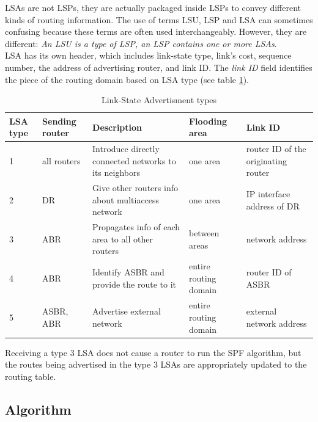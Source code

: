 LSAs are not LSPs, they are actually packaged inside LSPs to convey different kinds of routing information. The use of terms LSU, LSP and LSA can sometimes confusing because these terms are often used interchangeably. However, they are different: \emph{An LSU is a type of LSP, an LSP contains one or more LSAs}.\\
 
LSA has its own header, which includes link-state type, link's cost, sequence number, the address of advertising router, and link ID. The \emph{link ID} field identifies the piece of the routing domain based on LSA type (see table \ref{LSA-type}).

\begin{table}[h]
\centering
\caption{Link-State Advertisment types}
\label{LSA-type}
\begin{tabular}{@{} p{2em} p{3em} p{} p{} p{} @{}}
\toprule
LSA type & Sending router & Description                                            & Flooding area        & Link ID                             \\ \midrule
1        & all routers    & Introduce directly connected networks to its neighbors & one area             & router ID of the originating router \\
2        & DR             & Give other routers info about multiaccess network      & one area             & IP interface address of DR		\\
3        & ABR            & Propagates info of each area to all other routers      & between areas        & network address                 \\ 
4        & ABR            & Identify ASBR and provide the route to it              & entire routing domain& router ID of ASBR                 \\ 
5        & ASBR, ABR      & Advertise external network                             & entire routing domain& external network address         \\ \bottomrule
\end{tabular}
\end{table}

Receiving a type 3 LSA does not cause a router to run the SPF algorithm, but the routes being advertised in the type 3 LSAs are appropriately updated to the routing table.

\subsection{Algorithm}\label{sec:algorithm}

